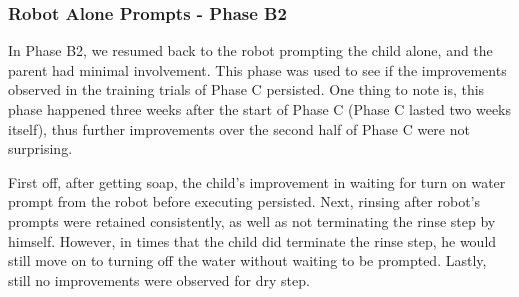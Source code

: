 \subsubsection{Robot Alone Prompts - Phase B2}
In Phase B2, we resumed back to the robot prompting the child alone, and the parent had minimal involvement.  This phase was used to see if the improvements observed in the training trials of Phase C persisted.  One thing to note is, this phase happened three weeks after the start of Phase C (Phase C lasted two weeks itself), thus further improvements over the second half of Phase C were not surprising.

First off, after getting soap, the child's improvement in waiting for turn on water prompt from the robot before executing persisted.  Next, rinsing after robot's prompts were retained consistently, as well as not terminating the rinse step by himself.  However, in times that the child did terminate the rinse step, he would still move on to turning off the water without waiting to be prompted.  Lastly, still no improvements were observed for dry step.

